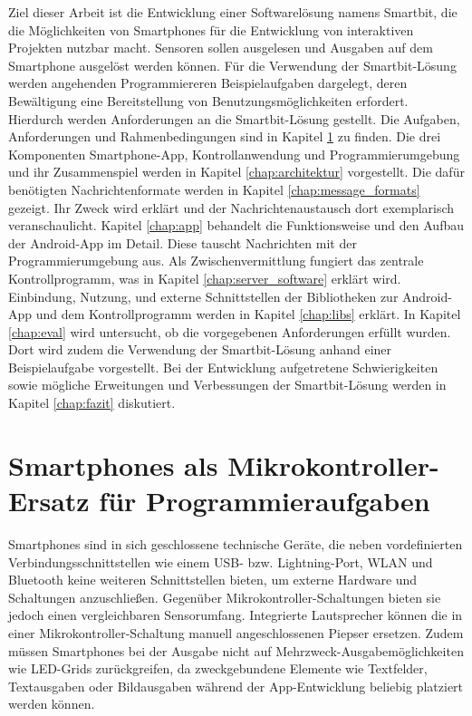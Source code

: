 \documentclass[11pt,a4paper]{report}
\begin{document}
Ziel dieser Arbeit ist die Entwicklung einer Softwarelösung namens Smartbit, die die Möglichkeiten von Smartphones für die Entwicklung von interaktiven Projekten nutzbar macht.
Sensoren sollen ausgelesen und Ausgaben auf dem Smartphone ausgelöst werden können.
Für die Verwendung der Smartbit-Lösung werden angehenden Programmiereren Beispielaufgaben dargelegt, deren Bewältigung eine Bereitstellung von Benutzungsmöglichkeiten erfordert.
Hierdurch werden Anforderungen an die Smartbit-Lösung gestellt.
Die Aufgaben, Anforderungen und Rahmenbedingungen sind in Kapitel \ref{chap:Experimente} zu finden.
Die drei Komponenten Smartphone-App, Kontrollanwendung und Programmierumgebung und ihr Zusammenspiel werden
in Kapitel \ref{chap:architektur} vorgestellt.
Die dafür benötigten Nachrichtenformate werden in Kapitel \ref{chap:message_formats} gezeigt.
Ihr Zweck wird erklärt und der Nachrichtenaustausch dort exemplarisch veranschaulicht.
Kapitel \ref{chap:app} behandelt die Funktionsweise und den Aufbau der Android-App im Detail.
Diese tauscht Nachrichten mit der Programmierumgebung aus.
Als Zwischenvermittlung fungiert das zentrale Kontrollprogramm, was in Kapitel \ref{chap:server_software} erklärt wird.
Einbindung, Nutzung, und externe Schnittstellen der Bibliotheken zur Android-App und dem Kontrollprogramm werden in Kapitel \ref{chap:libs} erklärt.
In Kapitel \ref{chap:eval} wird untersucht, ob die vorgegebenen Anforderungen erfüllt wurden.
Dort wird zudem die Verwendung der Smartbit-Lösung anhand einer Beispielaufgabe vorgestellt.
Bei der Entwicklung aufgetretene Schwierigkeiten sowie mögliche Erweitungen und Verbessungen der Smartbit-Lösung werden in Kapitel \ref{chap:fazit} diskutiert.

\chapter{Smartphones als Mikrokontroller-Ersatz für Programmieraufgaben} \label{chap:Experimente}
Smartphones sind in sich geschlossene technische Geräte, die neben vordefinierten Verbindungsschnittstellen wie einem USB- bzw. Lightning-Port, WLAN und Bluetooth keine weiteren Schnittstellen bieten, um externe Hardware und Schaltungen anzuschließen.
Gegenüber Mikrokontroller-Schaltungen bieten sie jedoch einen vergleichbaren Sensorumfang.
Integrierte Lautsprecher können die in einer Mikrokontroller-Schaltung  manuell angeschlossenen Piepser ersetzen.
Zudem müssen Smartphones bei der Ausgabe nicht auf Mehrzweck-Ausgabemöglichkeiten wie LED-Grids zurückgreifen, da zweckgebundene Elemente wie Textfelder, Textausgaben oder Bildausgaben während der App-Entwicklung beliebig platziert werden können.
\end{document}
